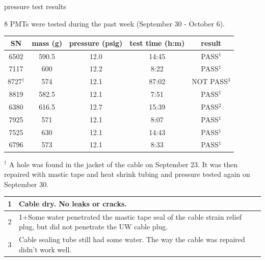 \documentclass{beamer}
\begin{document}
\begin{frame}{pressure test results}
	\begin{center}
		\small
		8 PMTs were tested during the past week (September 30 - October 6).
	\end{center}
\begin{table}
\small
{}
\begin{tabular}{c|c|c|c|c}
	SN & mass (g) & pressure (psig) & test time (h:m) & result \\
	\hline
	6502 & 590.5 & 12.0 & 14:45 & PASS$^1$ \\
	7117 & 600 & 12.2 & 8:22 & PASS$^1$ \\
	{\color{green}8727}$^\dagger$ & {\color{green}574} & {\color{green}12.1}
	& {\color{red}87:02} & {\color{green}NOT PASS}$^3$ \\
	8819 & 582.5 & 12.1 & 7:51 & PASS$^1$ \\
	6380 & 616.5 & 12.7 & 15:39 & PASS$^2$ \\
	7925 & 571 & 12.1 & 8:07 & PASS$^1$ \\
	7525 & 630 & 12.1 & 14:43 & PASS$^1$ \\
	6796 & 573 & 12.1 & 8:33 & PASS$^1$ \\
\end{tabular}
\end{table}
	\scriptsize
	$^\dagger$ A hole was found in the jacket of the cable on September 23. It was then 
	repaired with mastic tape and heat shrink tubing and pressure tested again on September 30.
	\setlength{\tabcolsep}{2pt}
	\scriptsize
	\begin{table}
		\begin{tabular}{|c|p{3.5in}|}
		\hline
		1 & Cable dry. No leaks or cracks. \\
		\hline
		2 & 1+Some water penetrated the mastic tape seal of the cable strain relief plug,
			but did not penetrate the UW cable plug. \\
		\hline
		3 & Cable sealing tube still had some water. The way the cable was repaired didn't
		work well.\\
		\hline
		\end{tabular}
	\end{table}
\end{frame}
\end{document}
